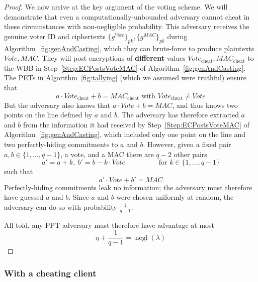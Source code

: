 \documentclass[12pt,a4paper]{article}
\DeclareMathOperator{\negl}{\text{negl}}
\theoremstyle{definition}
\newcommand{\Vote}{\mathit{Vote}}
\newcommand{\Mac}{\mathit{MAC}}
\begin{document}
\begin{proof}
    We now arrive at the key argument of the voting scheme. We will demonstrate that even a computationally-unbounded adversary cannot cheat in these circumstances with non-negligible probability. This adversary receives the genuine voter ID and ciphertexts $\{g^\Vote\}_{pk}, \{g^\Mac\}_{pk}$ during Algorithm~\ref{fig:genAndCasting}, which they can brute-force to produce plaintexts $\Vote, \Mac$. They will post encryptions of \textbf{different} values $\Vote_\text{cheat}, \Mac_\text{cheat}$ to the WBB in Step~\ref{Step:ECPostsVoteMAC} of Algorithm~\ref{fig:genAndCasting}. The PETs in Algorithm~\ref{fig:tallying} (which we assumed were truthful) ensure that
    $$a\cdot\Vote_\text{cheat}+b=\Mac_\text{cheat}\text{ with }\Vote_\text{cheat}\neq\Vote$$
    But the adversary also knows that $a\cdot\Vote+b=\Mac$, and thus knows two points on the line defined by $a$ and $b$. The adversary has therefore extracted $a$ and $b$ from the information it had received by Step~\ref{Step:ECPostsVoteMAC} of Algorithm~\ref{fig:genAndCasting}, which included only one point on the line and two perfectly-hiding commitments to $a$ and $b$. However, given a fixed pair $a,b\in\{1,\ldots,q-1\}$, a vote, and a MAC there are $q-2$ other pairs
    $$a'=a+k,\ b'=b-k\cdot Vote \hspace{2cm} \text{for }k\in\{1,\ldots,q-1\}$$
    such that
    $$a'\cdot\Vote+b'=\Mac$$
    Perfectly-hiding commitments leak no information; the adversary must therefore have guessed $a$ and $b$. Since $a$ and $b$ were chosen uniformly at random, the adversary can do so with probability $\frac{1}{q-1}$.

    All told, any PPT adversary must therefore have advantage at most
    $$\eta+\frac{1}{q-1}=\negl(\lambda)$$
\end{proof}
\subsubsection{With a cheating client}
\end{document}

